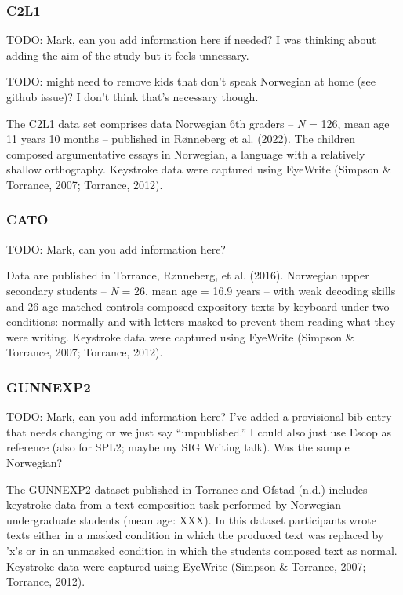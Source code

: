 \documentclass[
  english,
  man,floatsintext]{apa7}
\begin{document}
\hypertarget{c2l1}{%
\subsubsection{C2L1}\label{c2l1}}

TODO: Mark, can you add information here if needed? I was thinking about adding the aim of the study but it feels unnessary.

TODO: might need to remove kids that don't speak Norwegian at home (see github issue)? I don't think that's necessary though.

The C2L1 data set comprises data Norwegian 6th graders -- \emph{N} = 126, mean age 11 years 10 months -- published in Rønneberg et al. (2022). The children composed argumentative essays in Norwegian, a language with a relatively shallow orthography. Keystroke data were captured using EyeWrite (Simpson \& Torrance, 2007; Torrance, 2012).

\hypertarget{cato}{%
\subsubsection{CATO}\label{cato}}

TODO: Mark, can you add information here?

Data are published in Torrance, Rønneberg, et al. (2016). Norwegian upper secondary students -- \emph{N} = 26, mean age = 16.9 years -- with weak decoding skills and 26 age-matched controls composed expository texts by keyboard under two conditions: normally and with letters masked to prevent them reading what they were writing. Keystroke data were captured using EyeWrite (Simpson \& Torrance, 2007; Torrance, 2012).

\hypertarget{gunnexp2}{%
\subsubsection{GUNNEXP2}\label{gunnexp2}}

TODO: Mark, can you add information here? I've added a provisional bib entry that needs changing or we just say \enquote{unpublished.} I could also just use Escop as reference (also for SPL2; maybe my SIG Writing talk). Was the sample Norwegian?

The GUNNEXP2 dataset published in Torrance and Ofstad (n.d.) includes keystroke data from a text composition task performed by Norwegian undergraduate students (mean age: XXX). In this dataset participants wrote texts either in a masked condition in which the produced text was replaced by 'x's or in an unmasked condition in which the students composed text as normal. Keystroke data were captured using EyeWrite (Simpson \& Torrance, 2007; Torrance, 2012).
\end{document}
